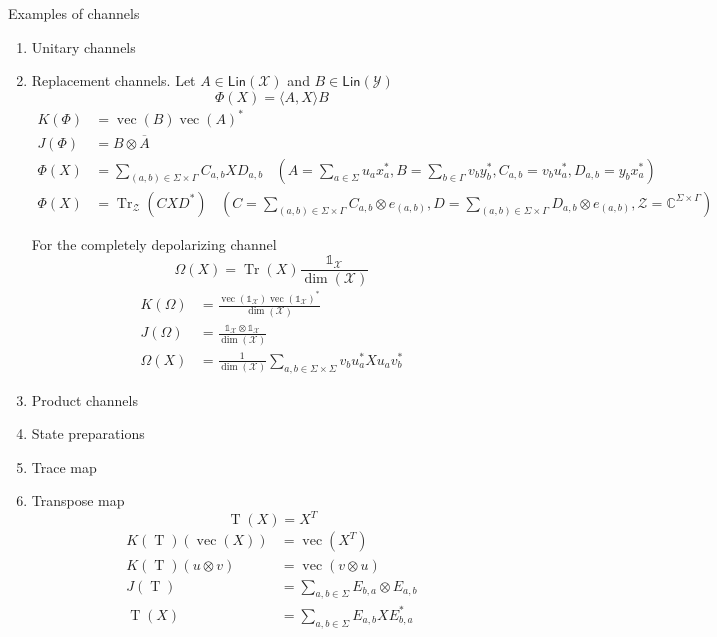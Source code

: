 \documentclass[aps,pra,onecolumn,notitlepage,superscriptaddress]{revtex4-1}
\newcommand{\C}{\mathbb{C}}
\newcommand{\spc}[1]{\mathcal{#1}}
\newcommand{\Lin}{\mathsf{Lin}}
\def\>{\rangle}
\def\<{\langle}
\newcommand{\Tr}{\operatorname{Tr}}
\newcommand{\op}[1]{\operatorname{#1}}
\newcommand\I{\mathds{1}}
\begin{document}
    Examples of channels
    \begin{enumerate}
        \item Unitary channels
        \item Replacement channels. Let $A \in \Lin(\spc X)$ and $B \in \Lin(\spc Y)$
        \begin{equation}
            \Phi(X) = \< A,X \> B
        \end{equation}
        \begin{align*}
            K(\Phi) &= \op{vec}(B)\op{vec}(A)^* \\
            J(\Phi) &= B \otimes \overline{A} \\
            \Phi(X) &= \sum_{(a,b) \in \Sigma \times \Gamma}  C_{a,b}XD_{a,b}  \ \ \ \ (A = \sum_{a \in \Sigma}u_ax_a^*, B = \sum_{b \in \Gamma}v_by_b^*,  C_{a,b} = v_bu_a^*, D_{a,b} = y_bx_a^*) \\
            \Phi(X) &= \Tr_{\spc Z}(CXD^*) \ \ \ \ (C = \sum_{(a,b)\in \Sigma \times \Gamma} C_{a,b} \otimes e_{(a,b)}, D = \sum_{(a,b) \in \Sigma \times \Gamma} D_{a,b} \otimes e_{(a,b)}, \spc Z = \C^{\Sigma \times \Gamma})
        \end{align*}

        For the completely depolarizing channel
        \begin{equation}
            \Omega(X) = \Tr(X) \frac{\I_{\spc X}}{\dim(\spc X)}
        \end{equation}
        \begin{align*}
            K(\Omega) &= \frac{\op{vec}(\I_{\spc X})\op{vec}(\I_{\spc X})^*}{\dim(\spc X)} \\
            J(\Omega) &= \frac{\I_{\spc X} \otimes \I_{\spc X} }{\dim(\spc X)} \\
            \Omega(X) &= \frac{1}{\dim(\spc X)} \sum_{a,b\in \Sigma\times\Sigma} v_bu_a^* X u_av_b^* 
        \end{align*}
        \item Product channels
        \item State preparations
        \item Trace map
        \item Transpose map
        \begin{equation}
            \op{T}(X) = X^T
        \end{equation}
        \begin{align*}
            K(\op{T})(\op{vec}(X)) &= \op{vec}(X^T) \\
            K(\op{T})(u \otimes v) &= \op{vec}(v \otimes u) \\
            J(\op{T}) &= \sum_{a,b \in \Sigma} E_{b,a} \otimes E_{a,b} \\
            \op{T}(X) &= \sum_{a,b \in \Sigma} E_{a,b} X E_{b,a}^*
        \end{align*}


\end{enumerate}
\end{document}
